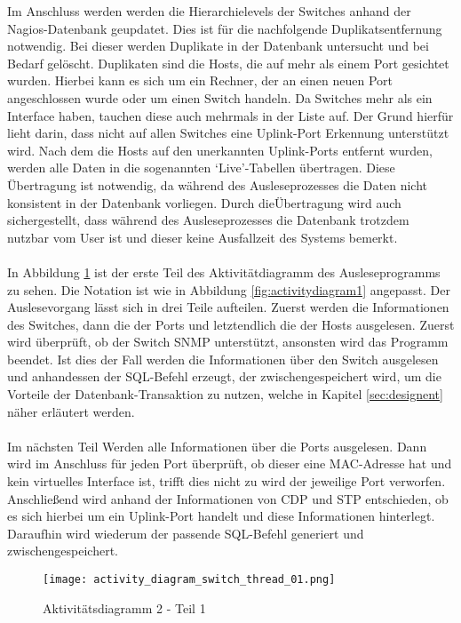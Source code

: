 Im Anschluss werden werden die Hierarchielevels der Switches anhand der Nagios-Datenbank geupdatet. Dies ist für die nachfolgende Duplikatsentfernung notwendig.
Bei dieser werden Duplikate in der Datenbank untersucht und bei Bedarf gelöscht.
Duplikaten sind die Hosts, die auf mehr als einem Port gesichtet wurden. Hierbei kann es sich um ein Rechner, der an einen neuen Port angeschlossen wurde oder um einen Switch handeln.
Da Switches mehr als ein Interface haben, tauchen diese auch mehrmals in der Liste auf. Der Grund hierfür lieht darin, dass nicht auf allen Switches eine Uplink-Port Erkennung unterstützt wird. Nach dem die Hosts auf den unerkannten Uplink-Ports entfernt wurden, werden alle Daten in die sogenannten ‘Live’-Tabellen übertragen. Diese Übertragung ist notwendig,  da während des Ausleseprozesses die Daten nicht konsistent in der Datenbank vorliegen. Durch dieÜbertragung wird auch sichergestellt, dass während des Ausleseprozesses die Datenbank trotzdem nutzbar vom User ist und dieser keine Ausfallzeit des Systems bemerkt.\\\\

In Abbildung \ref{fig:activitydiagram21} ist der erste Teil des Aktivitätdiagramm des Ausleseprogramms zu sehen.
Die Notation ist wie in Abbildung \ref{fig:activitydiagram1} angepasst.
Der Auslesevorgang lässt sich in drei Teile aufteilen. Zuerst werden die Informationen des Switches, dann die der Ports und letztendlich die der Hosts ausgelesen.
Zuerst wird überprüft, ob der Switch SNMP unterstützt, ansonsten wird das Programm beendet.
Ist dies der Fall werden die Informationen über den Switch ausgelesen und anhandessen der SQL-Befehl erzeugt, der zwischengespeichert wird, um die Vorteile der Datenbank-Transaktion zu nutzen, welche in Kapitel \ref{sec:designent} näher erläutert werden.\\\\
Im nächsten Teil Werden alle Informationen über die Ports ausgelesen.
Dann wird im Anschluss für jeden Port überprüft, ob dieser eine MAC-Adresse hat und kein virtuelles Interface ist, trifft dies nicht zu wird der jeweilige Port verworfen.
Anschließend wird anhand der Informationen von CDP und STP entschieden, ob es sich hierbei um ein Uplink-Port handelt und diese Informationen hinterlegt. Daraufhin wird wiederum der passende SQL-Befehl generiert und zwischengespeichert.

\begin{figure}[H]
\centering
\texttt{[image: activity\_diagram\_switch\_thread\_01.png]}
\caption{Aktivitätsdiagramm 2 - Teil 1}
\label{fig:activitydiagram21}
\end{figure}

